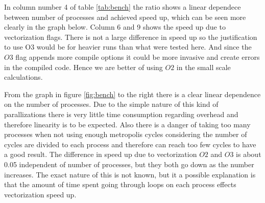 %

In column number 4 of table \ref{tab:bench} the ratio shows a linear dependece between 
number of processes and achieved speed up, which can be seen more clearly 
in the graph below. Column 6 and 9 shows the speed up due to vectorization flags.
There is not a large difference in speed up so the justification to use O3 would 
be for heavier runs than what were tested here. And since the $O3$ flag appends
more compile options it could be more invasive and create errors in the compiled
code. Hence we are better of using $O2$ in the small scale calculations.

From the graph in figure \ref{fig:bench} to the right there is a clear linear 
dependence on the number of processes. Due to the simple nature of this kind of parallizations there is very
little time consumption regarding overhead and therefore linearity is to be expected.
Also there is a danger of taking too many processes when not using enough metropolis
cycles considering the number of cycles are divided to each process and therefore 
can reach too few cycles to have a good result.
The difference in speed up due to vectorization $O2$ and $O3$ is about 0.05 independent 
of number of processes, but they both go down as the number increases. The exact nature
of this is not known, but it a possible explanation is that the amount of
time spent going through loops on each process effects vectorization speed up.
%
